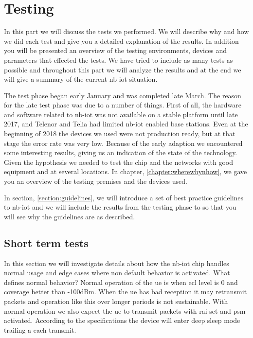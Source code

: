 \documentclass[USenglish]{ifimaster}  %
\begin{document}
\chapter{Testing} \label{section:testing}
In this part we will discuss the tests we performed. We will describe why and how we did each test and give you a detailed explanation of the results. In addition you will be presented an overview of the testing environments, devices and parameters that effected the tests. We have tried to include as many tests as possible and throughout this part we will analyze the results and at the end we will give a summary of the current \acrshort{nb-iot} situation.

The test phase began early January and was completed late March. The reason for the late test phase was due to a number of things. First of all, the hardware and software related to \acrshort{nb-iot} was not available on a stable platform until late 2017, and Telenor and Telia had limited \acrshort{nb-iot} enabled base stations. Even at the beginning of 2018 the devices we used were not production ready, but at that stage the error rate was very low. Because of the early adaption we encountered some interesting results, giving us an indication of the state of the technology. Given the hypothesis we needed to test the chip and the networks with good equipment and at several locations. In chapter, \vref{chapter:wherewhynhow}, we gave you an overview of the testing premises and the devices used.

In section, \vref{section:guidelines}, we will introduce a set of best practice guidelines to \acrshort{nb-iot} and we will include the results from the testing phase to so that you will see why the guidelines are as described.

\section{Short term tests} \label{section:detailedtest}
In this section we will investigate details about how the \acrshort{nb-iot} chip handles normal usage and edge cases where non default behavior is activated. What defines normal behavior? Normal operation of the \acrshort{ue} is when \acrshort{ecl} level is 0 and coverage better than -100dBm. When the \acrshort{ue} has bad reception it may retransmit packets and operation like this over longer periods is not sustainable. With normal operation we also expect the \acrshort{ue} to transmit packets with \acrshort{rai} set and \acrshort{psm} activated. According to the specifications the device will enter deep sleep mode trailing a each transmit.
\end{document}
